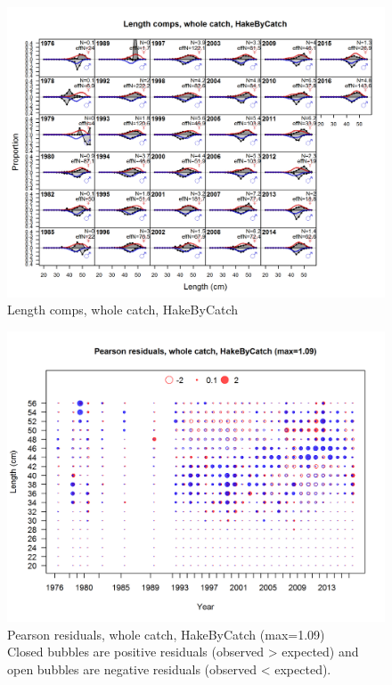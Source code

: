 \documentclass[12pt,]{article}
\begin{document}
\begin{figure}[htbp]
\centering
\includegraphics{./r4ss/plots_mod1/comp_lenfit_flt2mkt0.png}
\caption{Length comps, whole catch, HakeByCatch
\label{fig:mod1_10_comp_lenfit_flt2mkt0}}
\end{figure}

\begin{figure}[htbp]
\centering
\includegraphics{./r4ss/plots_mod1/comp_lenfit_residsflt2mkt0.png}
\caption{Pearson residuals, whole catch, HakeByCatch (max=1.09)\\
Closed bubbles are positive residuals (observed \textgreater{} expected)
and open bubbles are negative residuals (observed \textless{} expected).
\label{fig:mod1_11_comp_lenfit_residsflt2mkt0}}
\end{figure}
\end{document}
